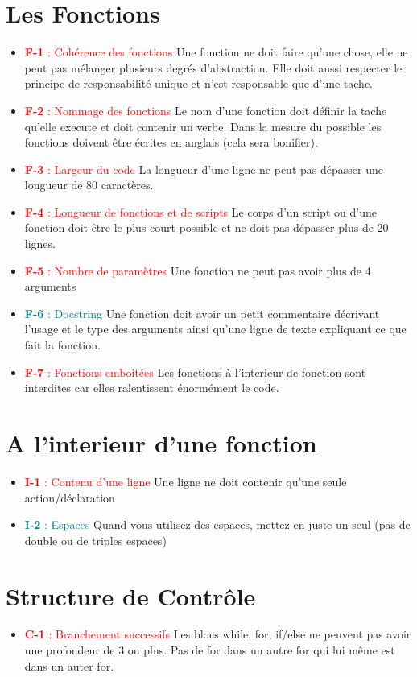 \documentclass[12pt,fleqn]{report}
\begin{document}
\section{Les Fonctions}
\begin{itemize}
    \item \textcolor{red}{\textbf{F-1} : Cohérence des fonctions} Une fonction ne doit faire qu'une chose, elle ne peut pas mélanger plusieurs degrés d'abstraction. Elle doit aussi respecter le principe de responsabilité unique et n'est responsable que d'une tache.
    \item \textcolor{red}{\textbf{F-2} : Nommage des fonctions} Le nom d'une fonction doit définir la tache qu'elle execute et doit contenir un verbe. Dans la mesure du possible les fonctions doivent être écrites en anglais (cela sera bonifier).
    \item \textcolor{red}{\textbf{F-3} : Largeur du code} La longueur d'une ligne ne peut pas dépasser une longueur de 80 caractères.
    \item \textcolor{red}{\textbf{F-4} : Longueur de fonctions et de scripts} Le corps d'un script ou d'une fonction doit être le plus court possible et ne doit pas dépasser plus de 20 lignes.
    \item \textcolor{red}{\textbf{F-5} : Nombre de paramètres} Une fonction ne peut pas avoir plus de 4 arguments
    \item \textcolor{teal}{\textbf{F-6} : Docstring} Une fonction doit avoir un petit commentaire décrivant l'usage et le type des arguments ainsi qu'une ligne de texte expliquant ce que fait la fonction.
    \item \textcolor{red}{\textbf{F-7} : Fonctions emboitées} Les fonctions à l'interieur de fonction sont interdites car elles ralentissent énormément le code. 
\end{itemize}

\section{A l'interieur d'une fonction}
\begin{itemize}
    \item \textcolor{red}{\textbf{I-1} : Contenu d'une ligne} Une ligne ne doit contenir qu'une seule action/déclaration
    \item \textcolor{teal}{\textbf{I-2} : Espaces} Quand vous utilisez des espaces, mettez en juste un seul (pas de double ou de triples espaces)
\end{itemize}

\section{Structure de Contrôle}
\begin{itemize}
    \item \textcolor{red}{\textbf{C-1} : Branchement successifs} Les blocs while, for, if/else ne peuvent pas avoir une profondeur de 3 ou plus. Pas de for dans un autre for qui lui même est dans un auter for.
    
\end{itemize}
\end{document}
